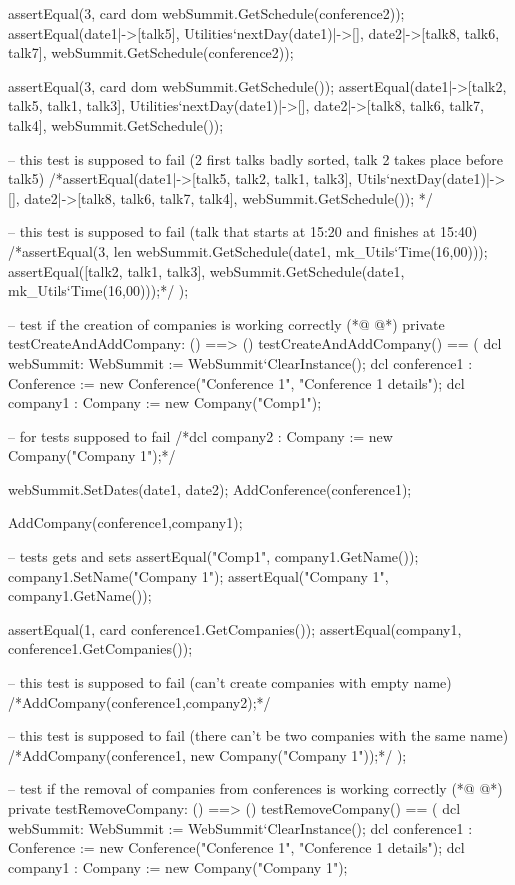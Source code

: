 \begin{vdmpp}[breaklines=true]
  assertEqual(3, card dom webSummit.GetSchedule(conference2));
  assertEqual({date1|->[talk5], Utilities`nextDay(date1)|->[], date2|->[talk8, talk6, talk7]}, webSummit.GetSchedule(conference2));
  
  assertEqual(3, card dom webSummit.GetSchedule());
  assertEqual({date1|->[talk2, talk5, talk1, talk3], Utilities`nextDay(date1)|->[], date2|->[talk8, talk6, talk7, talk4]}, webSummit.GetSchedule());
  
  -- this test is supposed to fail (2 first talks badly sorted, talk 2 takes place before talk5)
  /*assertEqual({date1|->[talk5, talk2, talk1, talk3], Utils`nextDay(date1)|->[], date2|->[talk8, talk6, talk7, talk4]}, webSummit.GetSchedule());
  */
  
  -- this test is supposed to fail (talk that starts at 15:20 and finishes at 15:40)
  /*assertEqual(3, len webSummit.GetSchedule(date1, mk_Utils`Time(16,00)));
   assertEqual([talk2, talk1, talk3], webSummit.GetSchedule(date1, mk_Utils`Time(16,00)));*/
 );
 
  -- test if the creation of companies is working correctly
(*@
\label{testCreateAndAddCompany:252}
@*)
 private testCreateAndAddCompany: () ==> ()
 testCreateAndAddCompany() == (
  dcl webSummit: WebSummit := WebSummit`ClearInstance();
  dcl conference1 : Conference := new Conference("Conference 1", "Conference 1 details");
  dcl company1 : Company := new Company("Comp1");
  
  -- for tests supposed to fail
  /*dcl company2 : Company := new Company("Company 1");*/
  
  webSummit.SetDates(date1, date2);
  AddConference(conference1);
  
  AddCompany(conference1,company1);
  
  -- tests gets and sets
  assertEqual("Comp1", company1.GetName());
  company1.SetName("Company 1");
  assertEqual("Company 1", company1.GetName());
  
  assertEqual(1, card conference1.GetCompanies());
  assertEqual({company1}, conference1.GetCompanies());
  
  -- this test is supposed to fail (can't create companies with empty name)
  /*AddCompany(conference1,company2);*/
  
  -- this test is supposed to fail (there can't be two companies with the same name)
  /*AddCompany(conference1, new Company("Company 1"));*/
 );
 
 -- test if the removal of companies from conferences is working correctly
(*@
\label{testRemoveCompany:282}
@*)
 private testRemoveCompany: () ==> ()
 testRemoveCompany() == (
  dcl webSummit: WebSummit := WebSummit`ClearInstance();
  dcl conference1 : Conference := new Conference("Conference 1", "Conference 1 details");
  dcl company1 : Company := new Company("Company 1");
  

\end{vdmpp}
